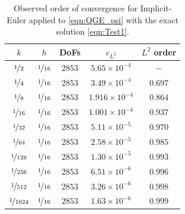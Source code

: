 \begin{table}
  \begin{center}
    \begin{tabular}{|c|c|c|c|c|}
      \hline
      $k$ & $h$ & DoFs & $e_{L^2}$ & $L^2$ order \\%
      \hline
      $\nicefrac{1}{2}$ & $\nicefrac{1}{16}$ & $2853$ & $5.65\times 10^{-4}$ & $-$ \\%
      $\nicefrac{1}{4}$ & $\nicefrac{1}{16}$ & $2853$ & $3.49\times 10^{-4}$ & $0.697$ \\%
      $\nicefrac{1}{8}$ & $\nicefrac{1}{16}$ & $2853$ & $1.916\times 10^{-4}$ & $0.864$ \\%
      $\nicefrac{1}{16}$ & $\nicefrac{1}{16}$ & $2853$ & $1.001\times 10^{-4}$ & $0.937$ \\%
      $\nicefrac{1}{32}$ & $\nicefrac{1}{16}$ & $2853$ & $5.11\times 10^{-5}$ & $0.970$ \\%
      $\nicefrac{1}{64}$ & $\nicefrac{1}{16}$ & $2853$ & $2.58\times 10^{-5}$ & $0.985$ \\%
      $\nicefrac{1}{128}$ & $\nicefrac{1}{16}$ & $2853$ & $1.30\times 10^{-5}$ & $0.993$ \\%
      $\nicefrac{1}{256}$ & $\nicefrac{1}{16}$ & $2853$ & $6.51\times 10^{-6}$ & $0.996$ \\%
      $\nicefrac{1}{512}$ & $\nicefrac{1}{16}$ & $2853$ & $3.26\times 10^{-6}$ & $0.998$ \\%
      $\nicefrac{1}{1024}$ & $\nicefrac{1}{16}$ & $2853$ & $1.63\times 10^{-6}$ & $0.999$ \\%
      \hline

    \end{tabular}
  \end{center}
  \caption{Observed order of convergence for Implicit-Euler applied to
    \eqref{eqn:QGE_psi} with the exact solution \eqref{eqn:Test1}.
  }
  \label{tab:Test1Time}
\end{table}

